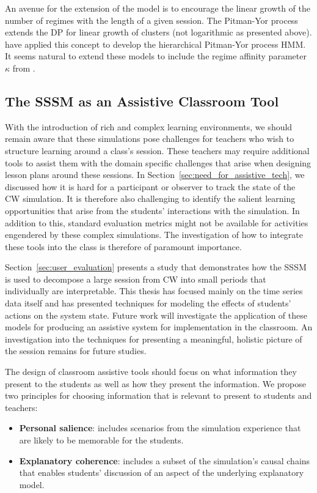 An avenue for the extension of the \cite{fox2009nonparametric} model is to encourage the linear growth of the number of regimes with the length of a given session. The Pitman-Yor process~\citep{pitman1997two} extends the DP for linear growth of clusters (not logarithmic as presented above). \cite{blunsom2011hierarchical} have applied this concept to develop the hierarchical Pitman-Yor process HMM. It seems natural to extend these models to include the regime affinity parameter $\kappa$ from \cite{fox2007hierarchical,fox2009nonparametric}.

\subsection{The SSSM as an Assistive Classroom Tool}\label{sec:class-assistive}
With the introduction of rich and complex learning environments, we should remain aware that these simulations pose challenges for teachers who wish to structure learning around a class's session. These teachers may require additional tools to assist them with the domain specific challenges that arise when designing lesson plans around these sessions. In Section~\ref{sec:need_for_assistive_tech}, we discussed how it is hard for a participant or observer to track the state of the CW simulation. It is therefore also challenging to identify the salient learning opportunities that arise from the students' interactions with the simulation. In addition to this, standard evaluation metrics might not be available for activities engendered by these complex simulations. The investigation of how to integrate these tools into the class is therefore of paramount importance.

Section~\ref{sec:user_evaluation} presents a study that demonstrates how the SSSM is used to decompose a large session from CW into small periods that individually are interpretable. This thesis has focused mainly on the time series data itself and has presented techniques for modeling the effects of students' actions on the system state. Future work will investigate the application of these models for producing an assistive system for implementation in the classroom. An investigation into the techniques for presenting a meaningful, holistic picture of the session remains for future studies.

The design of classroom assistive tools should focus on what information they present to the students as well as how they present the information. We propose two principles for choosing information that is relevant to present to students and teachers:
\begin{itemize}
  \item \textbf{Personal salience}: includes scenarios from the simulation experience that are likely to be memorable for the students.
  \item \textbf{Explanatory coherence}: includes a subset of the simulation’s causal chains that enables students’ discussion of an aspect of the underlying explanatory model.
\end{itemize}

